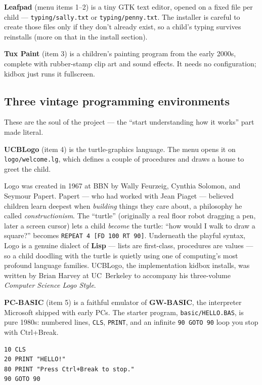\documentclass[11pt,oneside]{article}
\newcommand{\code}[1]{\texorpdfstring{\textcolor{kbblue}{\texttt{#1}}}{#1}}
\newcommand{\file}[1]{\textcolor{kbteal}{\texttt{#1}}}
\begin{document}
\textbf{Leafpad} (menu items 1--2) is a tiny GTK text editor, opened on a fixed
file per child --- \file{typing/sally.txt} or \file{typing/penny.txt}. The
installer is careful to create those files only if they don't already exist, so
a child's typing survives reinstalls (more on that in the install section).

\textbf{Tux Paint} (item 3) is a children's painting program from the early
2000s, complete with rubber-stamp clip art and sound effects. It needs no
configuration; kidbox just runs it fullscreen.

\subsection{Three vintage programming environments}

These are the soul of the project --- the ``start understanding how it works''
part made literal.

\textbf{UCBLogo} (item 4) is the turtle-graphics language. The menu opens it on
\file{logo/welcome.lg}, which defines a couple of procedures and draws a house
to greet the child.

\begin{deeper}
Logo was created in 1967 at BBN by Wally Feurzeig, Cynthia Solomon, and Seymour
Papert. Papert --- who had worked with Jean Piaget --- believed children learn
deepest when \emph{building} things they care about, a philosophy he called
\emph{constructionism}. The ``turtle'' (originally a real floor robot dragging a
pen, later a screen cursor) lets a child \emph{become} the turtle: ``how would I
walk to draw a square?'' becomes \code{REPEAT 4 [FD 100 RT 90]}. Underneath the
playful syntax, Logo is a genuine dialect of \textbf{Lisp} --- lists are
first-class, procedures are values --- so a child doodling with the turtle is
quietly using one of computing's most profound language families. UCBLogo, the
implementation kidbox installs, was written by Brian Harvey at UC~Berkeley to
accompany his three-volume \emph{Computer Science Logo Style}.
\end{deeper}

\textbf{PC-BASIC} (item 5) is a faithful emulator of \textbf{GW-BASIC}, the
interpreter Microsoft shipped with early PCs. The starter program,
\file{basic/HELLO.BAS}, is pure 1980s: numbered lines, \code{CLS}, \code{PRINT},
and an infinite \code{90 GOTO 90} loop you stop with Ctrl+Break.

\begin{lstlisting}
10 CLS
20 PRINT "HELLO!"
80 PRINT "Press Ctrl+Break to stop."
90 GOTO 90
\end{lstlisting}
\end{document}
